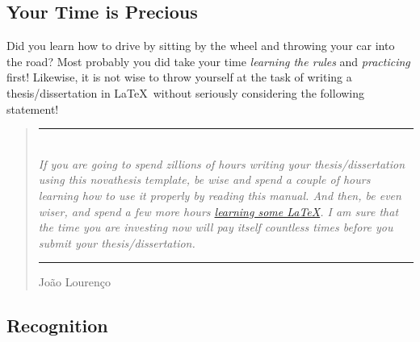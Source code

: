 \subsection{Your Time is Precious}
\label{sub:time_is_money}

Did you learn how to drive by sitting by the wheel and throwing your car into the road?  Most probably you did take your time \emph{learning the rules} and \emph{practicing} first! Likewise, it is not wise to throw yourself at the task of writing a thesis/dissertation in \LaTeX\ without seriously considering the following statement!


\bgroup
\renewcommand{\mkcitation}[1]{\\[0ex]\parbox{\linewidth}{\hfill\textbf{#1}}}
\blockquote[João Lourenço]{%
  \rule{\linewidth}{2pt}\\\itshape
  If you are going to spend zillions of hours writing your thesis/dissertation using this \gls{novathesis} template, be wise and spend a couple of hours learning how to use it properly by reading this manual.  And then, be even wiser, and spend a few more hours \href{https://github.com/joaomlourenco/novathesis/wiki\#learning-latex}{learning some \LaTeX}.  I am sure that the time you are investing now will pay itself countless times before you submit your thesis/dissertation.\\\nopagebreak
  \rule{\linewidth}{2pt}%
}
\egroup

\subsection{Recognition}
\label{sub:recognition}

